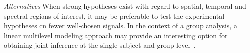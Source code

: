  \emph{Alternatives} When strong hypotheses exist with regard to spatial, temporal and spectral regions of interest, it may be preferable to test the experimental hypotheses on fewer well-chosen signals. In the context of a group analysis, a linear multilevel modeling approach may provide an interesting option for obtaining joint inference at the single subject and group level~\cite{gelman2006multilevel,baayen2008mixed}.
 
